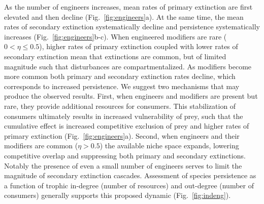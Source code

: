 \documentclass[twocolumn,preprintnumbers,amsmath,amssymb,superscriptaddress,linenumbers]{revtex4-1}
\begin{document}
\begin{bibunit}
As the number of engineers increases, mean rates of primary extinction are first elevated and then decline (Fig.\ \ref{fig:engineers}a).
At the same time, the mean rates of secondary extinction systematically decline and persistence systematically increases (Fig.\ \ref{fig:engineers}b-c).
When engineered modifiers are rare ($0 < \eta \leq 0.5$), higher rates of primary extinction coupled with lower rates of secondary extinction mean that extinctions are common, but of limited magnitude such that disturbances are compartmentalized.
As modifiers become more common both primary and secondary extinction rates decline, which corresponds to increased persistence.
We suggest two mechanisms that may produce the observed results.
First, when engineers and modifiers are present but rare, they provide additional resources for consumers.
This stabilization of consumers ultimately results in increased vulnerability of prey, such that the cumulative effect is increased competitive exclusion of prey and higher rates of primary extinction (Fig.\ \ref{fig:engineers}a).
Second, when engineers and their modifiers are common ($\eta > 0.5$) the available niche space expands, lowering competitive overlap and suppressing both primary and secondary extinctions.
Notably the presence of even a small number of engineers serves to limit the magnitude of secondary extinction cascades.
Assessment of species persistence as a function of trophic in-degree (number of resources) and out-degree (number of consumers) generally supports this proposed dynamic (Fig.\ \ref{fig:indeng}).




\end{bibunit}
\end{document}
